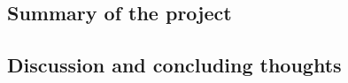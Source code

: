 \documentclass[12pt,a4paper,openright,twoside]{book}
\begin{document}
\chapter{\conclusionsname}
\label{chap:conclusions}

\section{Summary of the project}

\section{Discussion and concluding thoughts}



\nocite{*} %


\end{document}
